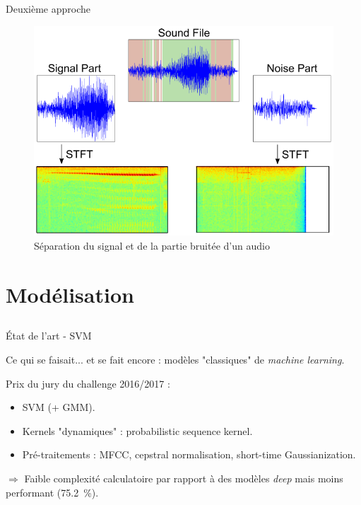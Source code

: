 \documentclass[compress,xcolor=table]{beamer}
\begin{document}
\begin{frame}{Deuxième approche}

    \begin{figure}[ht]
        \centering
        \includegraphics[width=\textwidth,height=0.8\textheight,keepaspectratio]{../images/noisereduce.pdf}
        \caption{Séparation du signal et de la partie bruitée d'un audio}
        \label{fig:noisereduce}
    \end{figure}

\end{frame}

\section{Modélisation} \subsection{}

\begin{frame}{État de l'art - SVM}

    Ce qui se faisait... et se fait encore : modèles "classiques" de \textit{machine learning}.

    Prix du jury du challenge 2016/2017 :

    \begin{exampleblock}{ \cite{thakurRapidBirdActivity2017}}

        \begin{itemize}
            \item SVM (+ GMM).
            \item Kernels "dynamiques" : probabilistic sequence kernel.
            \item Pré-traitements : MFCC, cepstral normalisation, short-time Gaussianization.
        \end{itemize}

        $\Rightarrow$ Faible complexité calculatoire par rapport à des modèles \textit{deep} mais moins performant (75.2~\%).

    \end{exampleblock}

\end{frame}
\end{document}
